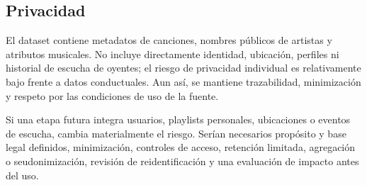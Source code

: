 \subsection{Privacidad}

El dataset contiene metadatos de canciones, nombres públicos de artistas y atributos musicales. No
incluye directamente identidad, ubicación, perfiles ni historial de escucha de oyentes; el riesgo de
privacidad individual es relativamente bajo frente a datos conductuales. Aun así, se mantiene
trazabilidad, minimización y respeto por las condiciones de uso de la fuente.

Si una etapa futura integra usuarios, playlists personales, ubicaciones o eventos de escucha, cambia
materialmente el riesgo. Serían necesarios propósito y base legal definidos, minimización, controles
de acceso, retención limitada, agregación o seudonimización, revisión de reidentificación y una
evaluación de impacto antes del uso.
